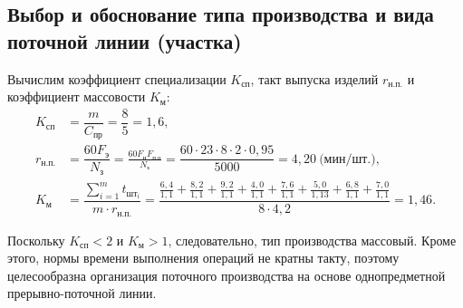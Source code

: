 \subsection[%
Выбор и обоснование типа производства и вида поточной линии \\
(участка)
]{%
  Выбор и обоснование типа производства и
  вида поточной линии (участка)
}

Вычислим коэффициент специализации \( K_{\text{сп}} \), 
такт выпуска изделий \( r_{\text{н.п.}}\) и
коэффициент массовости \( K_\text{м} \):
\begin{align*}
K_{\text{сп}} &= \dfrac{m}{C_{\text{пр}}} = \dfrac{8}{5} = 1{,}6, \\
r_{\text{н.п.}} &= \dfrac{60 F_{\text{э}}}{N_{\text{з}}} = 
  \frac{60 F_{\text{н}} F_{\text{п.о}}}{N_{\text{з}}} =
  \dfrac{60 \cdot 23 \cdot 8 \cdot 2 \cdot 0{,}95}{5000} =
  4{,}20 \: \text{(мин/шт.)}, \\
K_{\text{м}} &=
\dfrac{\sum^m_{i=1} t_{\text{шт}_{i}}}{m \cdot r_{\text{н.п.}}} = 
\dfrac{
  \frac{6{,}4}{1{,}1} + \frac{8{,}2}{1{,}1} + \frac{9{,}2}{1{,}1} + 
  \frac{4{,}0}{1{,}1} + \frac{7{,}6}{1{,}1} + \frac{5{,}0}{1{,}13} +
  \frac{6{,}8}{1{,}1} + \frac{7{,}0}{1{,}1}
}{
  8 \cdot 4{,}2
} = 1{,}46.
\end{align*}

Поскольку \( K_{\text{сп}} < 2 \) и \( K_{\text{м}} > 1 \),
следовательно, тип производства массовый.
Кроме этого, нормы времени выполнения операций не кратны такту, 
поэтому целесообразна организация поточного производства на основе
однопредметной прерывно-поточной линии.